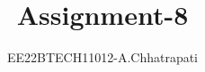 \documentclass[journal,12pt,twocolumn]{IEEEtran}
\theoremstyle{remark}
\begin{document}
%




\vspace{3cm}

\title{
Assignment-8
}
\author{EE22BTECH11012-A.Chhatrapati}


\maketitle

\newpage


\bigskip

\renewcommand{\thefigure}{\theenumi}
\renewcommand{\thetable}{\theenumi}


\providecommand{\pr}[1]{\ensuremath{\Pr\left(#1\right)}}
\providecommand{\prt}[2]{\ensuremath{p_{#1}^{\left(#2\right)} }}        %
\providecommand{\qfunc}[1]{\ensuremath{Q\left(#1\right)}}
\providecommand{\sbrak}[1]{\ensuremath{{}\left[#1\right]}}
\providecommand{\lsbrak}[1]{\ensuremath{{}\left[#1\right.}}
\providecommand{\rsbrak}[1]{\ensuremath{{}\left.#1\right]}}
\providecommand{\brak}[1]{\ensuremath{\left(#1\right)}}
\providecommand{\lbrak}[1]{\ensuremath{\left(#1\right.}}
\providecommand{\rbrak}[1]{\ensuremath{\left.#1\right)}}
\providecommand{\cbrak}[1]{\ensuremath{\left\{#1\right\}}}
\providecommand{\lcbrak}[1]{\ensuremath{\left\{#1\right.}}
\providecommand{\rcbrak}[1]{\ensuremath{\left.#1\right\}}}
\newcommand{\sgn}{\mathop{\mathrm{sgn}}}
\providecommand{\abs}[1]{\left\vert#1\right\vert}
\providecommand{\res}[1]{\Res\displaylimits_{#1}} 
\providecommand{\norm}[1]{\left\lVert#1\right\rVert}
\providecommand{\mtx}[1]{\mathbf{#1}}
\providecommand{\mean}[1]{E\left[ #1 \right]}
\providecommand{\cond}[2]{#1\middle|#2}
\providecommand{\fourier}{\overset{\mathcal{F}}{ \rightleftharpoons}}
\newenvironment{amatrix}[1]{%
  \left(\begin{array}{@{}*{#1}{c}|c@{}}
}{%
  \end{array}\right)
}
\end{document}
